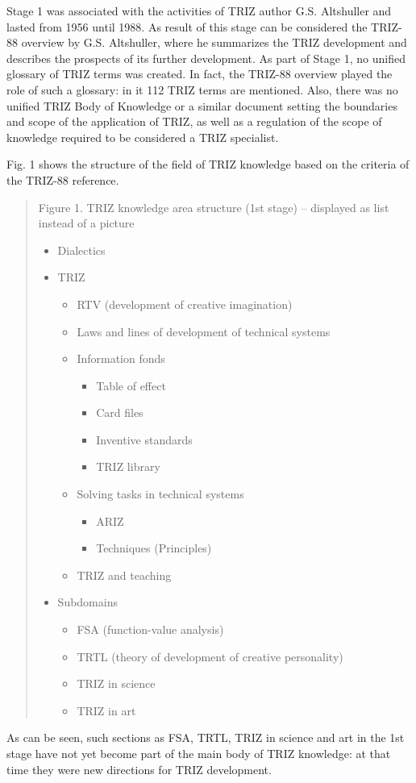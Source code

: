 \documentclass[11pt,a4paper]{article}
\begin{document}
Stage 1 was associated with the activities of TRIZ author G.S. Altshuller and
lasted from 1956 until 1988. As result of this stage can be considered the
TRIZ-88 overview by G.S. Altshuller, where he summarizes the TRIZ development
and describes the prospects of its further development. As part of Stage 1, no
unified glossary of TRIZ terms was created.  In fact, the TRIZ-88 overview
played the role of such a glossary: in it 112 TRIZ terms are mentioned. Also,
there was no unified TRIZ Body of Knowledge or a similar document setting the
boundaries and scope of the application of TRIZ, as well as a regulation of
the scope of knowledge required to be considered a TRIZ specialist.

Fig. 1 shows the structure of the field of TRIZ knowledge based on the
criteria of the TRIZ-88 reference.

\begin{quote}
  Figure 1. TRIZ knowledge area structure (1st stage) -- displayed as list
  instead of a picture 
  
  \begin{itemize}[noitemsep]
  \item Dialectics
  \item TRIZ
    \begin{itemize}[noitemsep]
    \item RTV (development of creative imagination)
    \item Laws and lines of development of technical systems
    \item Information fonds
      \begin{itemize}[noitemsep]
      \item Table of effect
      \item Card files
      \item Inventive standards
      \item TRIZ library
      \end{itemize}
    \item Solving tasks in technical systems
      \begin{itemize}[noitemsep]
      \item ARIZ
      \item Techniques (Principles)
      \end{itemize}
    \item TRIZ and teaching
    \end{itemize}
  \item Subdomains
    \begin{itemize}[noitemsep]
    \item FSA (function-value analysis)
    \item TRTL (theory of development of creative personality)
    \item TRIZ in science
    \item TRIZ in art
    \end{itemize}
  \end{itemize}  
\end{quote}
As can be seen, such sections as FSA, TRTL, TRIZ in science and art in the 1st
stage have not yet become part of the main body of TRIZ knowledge: at that
time they were new directions for TRIZ development.
\end{document}
